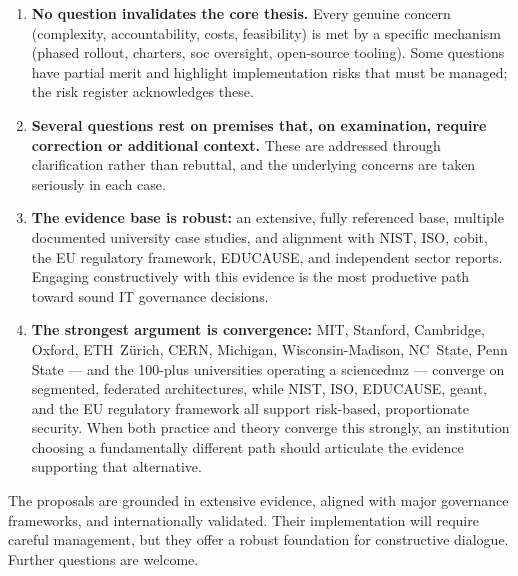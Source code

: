 \begin{enumerate}
    \item \textbf{No question invalidates the core thesis.} Every genuine concern (complexity, accountability, costs, feasibility) is met by a specific mechanism (phased rollout, charters, \gls{soc} oversight, open-source tooling). Some questions have partial merit and highlight implementation risks that must be managed; the risk register acknowledges these.

    \item \textbf{Several questions rest on premises that, on examination, require correction or additional context.} These are addressed through clarification rather than rebuttal, and the underlying concerns are taken seriously in each case.

    \item \textbf{The evidence base is robust:} an extensive, fully referenced base, multiple documented university case studies, and alignment with NIST, ISO, \gls{cobit}, the EU regulatory framework, EDUCAUSE, and independent sector reports. Engaging constructively with this evidence is the most productive path toward sound IT governance decisions.

    \item \textbf{The strongest argument is convergence:} MIT, Stanford, Cambridge, Oxford, ETH~Z\"urich, CERN, Michigan, Wisconsin-Madison, NC~State, Penn State --- and the 100-plus universities operating a \gls{sciencedmz} --- converge on segmented, federated architectures, while NIST, ISO, EDUCAUSE, \gls{geant}, and the EU regulatory framework all support risk-based, proportionate security. When both practice and theory converge this strongly, an institution choosing a fundamentally different path should articulate the evidence supporting that alternative.
\end{enumerate}

\medskip\noindent The proposals are grounded in extensive evidence, aligned with major governance frameworks, and internationally validated. Their implementation will require careful management, but they offer a robust foundation for constructive dialogue. Further questions are welcome.
